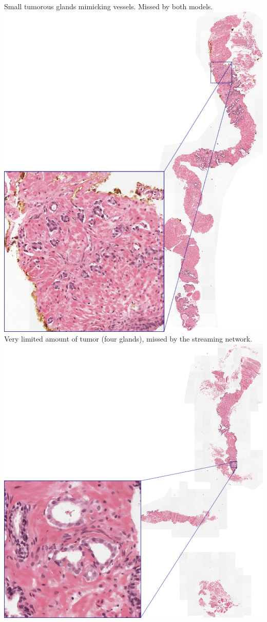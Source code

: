 \documentclass[
  12pt,
  a5,margin=2cmpaper,
]{article}
\begin{document}
Small tumorous glands mimicking vessels. Missed by both
models.\includegraphics{chpt3_imgs/both_missed_FN.png} Very limited
amount of tumor (four glands), missed by the streaming
network.\includegraphics{chpt3_imgs/e2e_FN.png}
\end{document}
